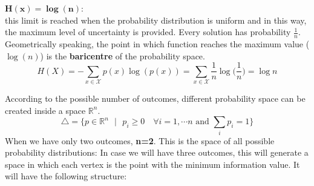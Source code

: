 $\mathbf{H(x) = \log(n)}$:\\
this limit is reached when the probability distribution is uniform and in this way, the maximum level of uncertainty is provided. Every solution has probability $\frac{1}{n}$. Geometrically speaking, the point in which function reaches the maximum value ($\log(n)$) is the \textbf{baricentre} of the probability space.\\
$$H(X) =  - \sum_{x \in \mathcal{X}}p(x)\log(p(x)) =  \sum_{x \in \mathcal{X}}\frac{1}{n}\log\Big(\frac{1}{n}\Big) = \log n$$

According to the possible number of outcomes, different probability space can be created inside a space $\mathbb{R}^n$.
$$\bigtriangleup = \{p \in \mathbb{R}^n \text{  } |\text{  } p_i \geq 0 \quad	\forall i = 1, \cdots n \text{ and } \sum_i p_i = 1\}$$
When we have only two outcomes, \textbf{n=2}. This is the space of all possible probability distributions:
In case we will have three outcomes, this will generate a space in which each vertex is the point with the minimum information value. It will have the following structure:



